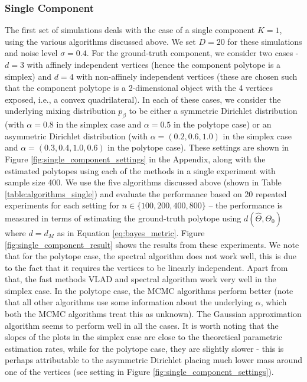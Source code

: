 \documentclass[bj,authoryear]{imsart}
\theoremstyle{plain}
\theoremstyle{remark}
\begin{document}
\subsubsection*{Single Component}
The first set of simulations deals with the case of a single component $K=1$, using the various algorithms discussed above. We set $D=20$ for these simulations and noise level $\sigma=0.4$. For the ground-truth component, we consider two cases - $d=3$ with affinely independent  vertices (hence the component polytope is a simplex) and $d=4$ with non-affinely independent vertices (these are chosen such that the component polytope is a 2-dimensional object with the 4 vertices exposed, i.e., a convex quadrilateral). In each of these cases, we consider the underlying mixing distribution $p_{\beta}$ to be either a symmetric Dirichlet distribution (with $\alpha=0.8$ in the simplex case and $\alpha=0.5$ in the polytope case) or an asymmetric Dirichlet distribution (with $\alpha=(0.2, 0.6, 1.0)$ in the simplex case and $\alpha=(0.3, 0.4, 1.0, 0.6)$ in the polytope case).  These settings are shown in Figure \ref{fig:single_component_settings} in the Appendix, along with the estimated polytopes using each of the methods in a single experiment with sample size 400. We use the five algorithms discussed above (shown in Table \ref{table:algorithms_single}) and evaluate the performance based on 20 repeated experiments for each setting for $n\in\{100,200,400,800\}$ -- the performance is measured in terms of estimating the ground-truth polytope using $d(\hat{\Theta},\Theta_0)$ where $d=d_M$ as in Equation \eqref{eq:bayes_metric}. Figure \ref{fig:single_component_result} shows the results from these experiments. We note that for the polytope case, the spectral algorithm does not work well, this is due to the fact that it requires the vertices to be linearly independent. Apart from that, the fast methods VLAD and spectral algorithm work very well in the simplex case. In the polytope case, the MCMC algorithms perform better (note that all other algorithms use some information about the underlying $\alpha$, which both the MCMC algorithms treat this as unknown). The Gaussian approximation algorithm seems to perform well in all the cases. It is worth noting that the slopes of the plots in the simplex case  are close  to the theoretical parametric estimation rates, while for the polytope case, they are slightly slower - this is perhaps attributable to the asymmetric Dirichlet placing much lower mass around one of the vertices (see setting in  Figure \ref{fig:single_component_settings}).
\end{document}
